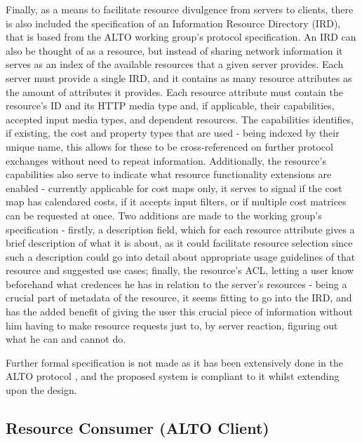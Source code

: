     Finally, as a means to facilitate resource divulgence from servers to clients, there is also included the specification of an Information Resource Directory (IRD), that is based from the ALTO working group's protocol specification.
    An IRD can also be thought of as a resource, but instead of sharing network information it serves as an index of the available resources that a given server provides.
    Each server must provide a single IRD, and it contains as many resource attributes as the amount of attributes it provides.
    Each resource attribute must contain the resource's ID and its HTTP media type and, if applicable, their capabilities, accepted input media types, and dependent resources.
    The capabilities identifies, if existing, the cost and property types that are used - being indexed by their unique name, this allows for these to be cross-referenced on further protocol exchanges without need to repeat information.
    Additionally, the resource's capabilities also serve to indicate what resource functionality extensions are enabled - currently applicable for cost maps only, it serves to signal if the cost map has calendared costs, if it accepts input filters, or if multiple cost matrices can be requested at once.
    Two additions are made to the working group's specification - firstly, a description field, which for each resource attribute gives a brief description of what it is about, as it could facilitate resource selection since such a description could go into detail about appropriate usage guidelines of that resource and suggested use cases; finally, the resource's ACL, letting a user know beforehand what credences he has in relation to the server's resources - being a crucial part of metadata of the resource, it seems fitting to go into the IRD, and has the added benefit of giving the user this crucial piece of information without him having to make resource requests just to, by server reaction, figuring out what he can and cannot do.

    Further formal specification is not made as it has been extensively done in the ALTO protocol \cite{alto-protocol}, and the proposed system is compliant to it whilst extending upon the design.



\subsection{Resource Consumer (ALTO Client)}

